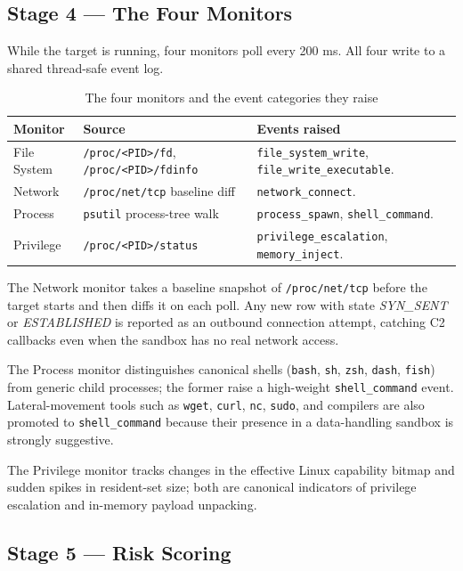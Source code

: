 \documentclass[12pt, a4paper]{report}
\begin{document}
\subsection{Stage 4 --- The Four Monitors}

While the target is running, four monitors poll every 200 ms. All four
write to a shared thread-safe event log.

\begin{table}[H]
\centering
\caption{The four monitors and the event categories they raise}
\label{tab:sb_monitors}
\begin{tabular}{|l|p{4.3cm}|p{5.5cm}|}
\hline
\textbf{Monitor} & \textbf{Source} & \textbf{Events raised} \\
\hline
File System & \texttt{/proc/<PID>/fd}, \texttt{/proc/<PID>/fdinfo} & \texttt{file\_system\_write}, \texttt{file\_write\_executable}. \\
\hline
Network & \texttt{/proc/net/tcp} baseline diff & \texttt{network\_connect}. \\
\hline
Process & \texttt{psutil} process-tree walk & \texttt{process\_spawn}, \texttt{shell\_command}. \\
\hline
Privilege & \texttt{/proc/<PID>/status} & \texttt{privilege\_escalation}, \texttt{memory\_inject}. \\
\hline
\end{tabular}
\end{table}

The Network monitor takes a baseline snapshot of
\texttt{/proc/net/tcp} before the target starts and then diffs it on
each poll. Any new row with state \emph{SYN\_SENT} or \emph{ESTABLISHED}
is reported as an outbound connection attempt, catching C2 callbacks
even when the sandbox has no real network access.

The Process monitor distinguishes canonical shells (\texttt{bash},
\texttt{sh}, \texttt{zsh}, \texttt{dash}, \texttt{fish}) from generic
child processes; the former raise a high-weight \texttt{shell\_command}
event. Lateral-movement tools such as \texttt{wget}, \texttt{curl},
\texttt{nc}, \texttt{sudo}, and compilers are also promoted to
\texttt{shell\_command} because their presence in a data-handling
sandbox is strongly suggestive.

The Privilege monitor tracks changes in the effective Linux
capability bitmap and sudden spikes in resident-set size; both are
canonical indicators of privilege escalation and in-memory payload
unpacking.

\subsection{Stage 5 --- Risk Scoring}
\end{document}

